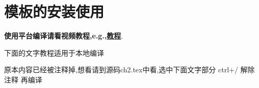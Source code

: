 
\section{模板的安装使用}\label{ch:install}

\textbf{使用平台编译请看视频教程,e.g.,\href{https://youtu.be/P5EWoPOnZTU}{教程}}.

下面的文字教程适用于本地编译

原本内容已经被注释掉,想看请到源码ch2.tex中看,选中下面文字部分  ctrl+/  解除注释 再编译










